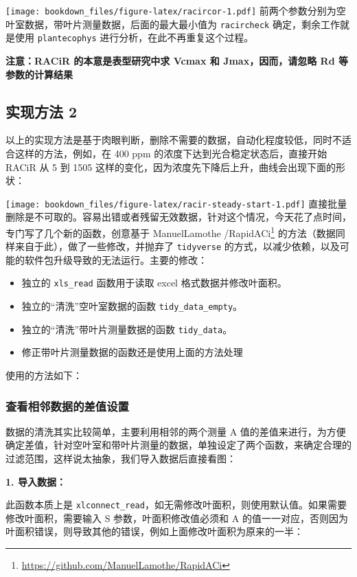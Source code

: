 \documentclass[
]{krantz}
\providecommand{\tightlist}{%
  \setlength{\itemsep}{0pt}\setlength{\parskip}{0pt}}
\renewcommand{\href}[2]{#2\footnote{\url{#1}}}
\begin{document}
\texttt{[image: bookdown\_files/figure-latex/racircor-1.pdf]}
前两个参数分别为空叶室数据，带叶片测量数据，后面的最大最小值为 \texttt{racircheck} 确定，剩余工作就是使用 \texttt{plantecophys} 进行分析，在此不再重复这个过程。

\textbf{注意：RACiR 的本意是表型研究中求 Vcmax 和 Jmax，因而，请忽略 Rd 等参数的计算结果}

\hypertarget{racir_pkg_2}{%
\subsection{实现方法 2}\label{racir_pkg_2}}

以上的实现方法是基于肉眼判断，删除不需要的数据，自动化程度较低，同时不适合这样的方法，例如，在 400 ppm 的浓度下达到光合稳定状态后，直接开始 RACiR 从 5 到 1505 这样的变化，因为浓度先下降后上升，曲线会出现下面的形状：

\texttt{[image: bookdown\_files/figure-latex/racir-steady-start-1.pdf]}
直接批量删除是不可取的。容易出错或者残留无效数据，针对这个情况，今天花了点时间，专门写了几个新的函数，创意基于 \href{https://github.com/ManuelLamothe/RapidACi}{ManuelLamothe
/RapidACi} 的方法（数据同样来自于此），做了一些修改，并抛弃了 \texttt{tidyverse} 的方式，以减少依赖，以及可能的软件包升级导致的无法运行。主要的修改：

\begin{itemize}
\tightlist
\item
  独立的 \texttt{xls\_read} 函数用于读取 excel 格式数据并修改叶面积。
\item
  独立的``清洗''空叶室数据的函数 \texttt{tidy\_data\_empty}。
\item
  独立的``清洗''带叶片测量数据的函数 \texttt{tidy\_data}。
\item
  修正带叶片测量数据的函数还是使用上面的方法处理
\end{itemize}

使用的方法如下：

\hypertarget{delta_max-check}{%
\subsubsection{查看相邻数据的差值设置}\label{delta_max-check}}

数据的清洗其实比较简单，主要利用相邻的两个测量 A 值的差值来进行，为方便确定差值，针对空叶室和带叶片测量的数据，单独设定了两个函数，来确定合理的过滤范围，这样说太抽象，我们导入数据后直接看图：

\textbf{1. 导入数据：}

此函数本质上是 \texttt{xlconnect\_read}，如无需修改叶面积，则使用默认值。如果需要修改叶面积，需要输入 S 参数，叶面积修改值必须和 A 的值一一对应，否则因为叶面积错误，则导致其他的错误，例如上面修改叶面积为原来的一半：
\end{document}
